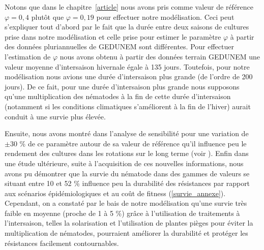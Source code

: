 	Notons que dans le chapitre~\ref{article} nous avons pris comme valeur de référence $\varphi = 0,4$ plutôt que $\varphi = 0,19$ pour effectuer notre modélisation. Ceci peut s'expliquer tout d'abord par le fait que la durée entre deux saisons de cultures prise dans notre modélisation et celle prise pour estimer le paramètre $\varphi$ à partir des données pluriannuelles de \gls{GEDUNEM} sont différentes. Pour effectuer l'estimation de $\varphi$ nous avons obtenu à partir des données terrain \gls{GEDUNEM} une valeur moyenne d'intersaison hivernale égale à 135 jours. Toutefois, pour notre modélisation nous avions une durée d'intersaison plus grande (de l'ordre de 200 jours).  De ce fait, pour une durée d'intersaison plus grande  nous supposons qu'une multiplication des nématodes à la fin de cette durée d'intersaison (notamment si les conditions climatiques s'améliorent à la fin de l'hiver)  aurait conduit à une survie plus élevée.
	
	Ensuite, nous avons montré dans l'analyse de sensibilité  pour une variation de $\pm{30}$ \% de ce paramètre autour de sa valeur de référence qu'il influence peu le rendement des cultures dans les rotations sur le long terme (voir ). Enfin dans une étude ultérieure, suite à l'acquisition de ces nouvelles informations, nous avons pu démontrer  que la survie du nématode dans des gammes de valeurs se situant entre  10 et 52 \%  influence peu la durabilité des résistances par rapport aux scénarios épidémiologiques et au coût de fitness  (\autoref{survie_annexe}).  %
Cependant, on a constaté par le bais de notre modélisation qu'une survie très faible en moyenne (proche de  1 à 5 \%)  grâce à l'utilisation de traitements à l'intersaison, telles la solarisation et l'utilisation de plantes pièges pour éviter la multiplication de nématodes, pourraient améliorer la durabilité et protéger les résistances facilement contournables.	
	  
